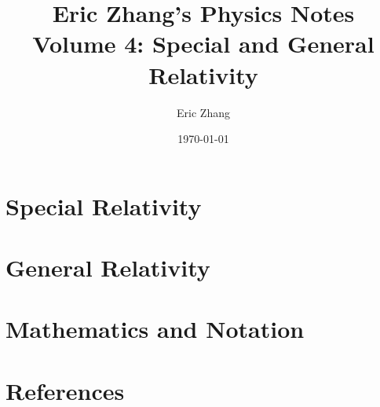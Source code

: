 \documentclass[a4paper, titlepage]{book}
\title{
    Eric Zhang's Physics Notes \\
    \large Volume 4: Special and General Relativity
}
\author{Eric Zhang}
\date{\today}
\begin{document}
\frontmatter
\maketitle
\tableofcontents


\mainmatter
\chapter{Special Relativity}


\chapter{General Relativity}

\appendix
\chapter{Mathematics and Notation}


\chapter{References}
\end{document}
